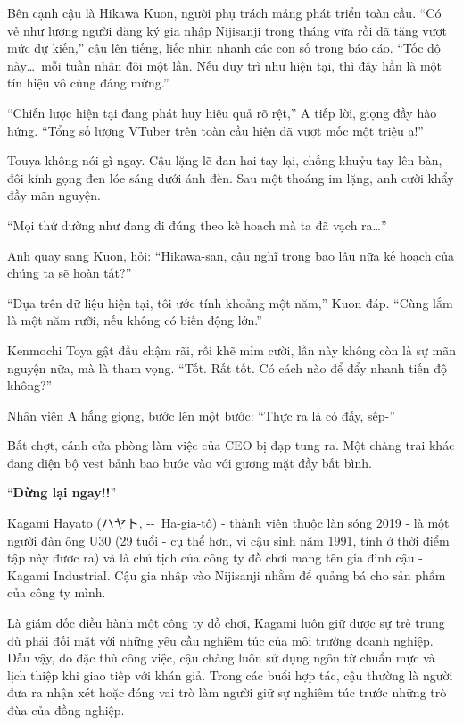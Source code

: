 \documentclass[../main.tex]{subfiles}
\begin{document}
\chrint

Bên cạnh cậu là Hikawa Kuon, người phụ trách mảng phát triển toàn cầu. ``Có vẻ như lượng người đăng ký gia nhập Nijisanji trong tháng vừa rồi đã tăng vượt mức dự kiến,'' cậu lên tiếng, liếc nhìn nhanh các con số trong báo cáo. ``Tốc độ này\dots\ mỗi tuần nhân đôi một lần. Nếu duy trì như hiện tại, thì đây hẳn là một tín hiệu vô cùng đáng mừng.''

``Chiến lược hiện tại đang phát huy hiệu quả rõ rệt,'' A tiếp lời, giọng đầy hào hứng. ``Tổng số lượng VTuber trên toàn cầu hiện đã vượt mốc một triệu ạ!''

Touya không nói gì ngay. Cậu lặng lẽ đan hai tay lại, chống khuỷu tay lên bàn, đôi kính gọng đen lóe sáng dưới ánh đèn. Sau một thoáng im lặng, anh cười khẩy đầy mãn nguyện.


``Mọi thứ dường như đang đi đúng theo kế hoạch mà ta đã vạch ra\dots''

Anh quay sang Kuon, hỏi: ``Hikawa-san, cậu nghĩ trong bao lâu nữa kế hoạch của chúng ta sẽ hoàn tất?''

``Dựa trên dữ liệu hiện tại, tôi ước tính khoảng một năm,'' Kuon đáp. ``Cùng lắm là một năm rưỡi, nếu không có biến động lớn.''

Kenmochi Toya gật đầu chậm rãi, rồi khẽ mỉm cười, lần này không còn là sự mãn nguyện nữa, mà là tham vọng. ``Tốt. Rất tốt. Có cách nào để đẩy nhanh tiến độ không?''

Nhân viên A hắng giọng, bước lên một bước: ``Thực ra là có đấy, sếp-''

Bất chợt, cánh cửa phòng làm việc của CEO bị đạp tung ra. Một chàng trai khác đang diện bộ vest bảnh bao bước vào với gương mặt đầy bất bình.


``\textbf{Dừng lại ngay!!}''

\chrint


Kagami Hayato (ハヤト, --\ Ha-gia-tô) - thành viên thuộc làn sóng 2019 - là một người đàn ông U30 (29 tuổi - cụ thể hơn, vì cậu sinh năm 1991, tính ở thời điểm tập này được ra) và là chủ tịch của công ty đồ chơi mang tên gia đình cậu - Kagami Industrial. Cậu gia nhập vào Nijisanji nhằm để quảng bá cho sản phẩm của công ty mình.

Là giám đốc điều hành một công ty đồ chơi, Kagami luôn giữ được sự trẻ trung dù phải đối mặt với những yêu cầu nghiêm túc của môi trường doanh nghiệp. Dẫu vậy, do đặc thù công việc, cậu chàng luôn sử dụng ngôn từ chuẩn mực và lịch thiệp khi giao tiếp với khán giả. Trong các buổi hợp tác, cậu thường là người đưa ra nhận xét hoặc đóng vai trò làm người giữ sự nghiêm túc trước những trò đùa của đồng nghiệp.
\end{document}
